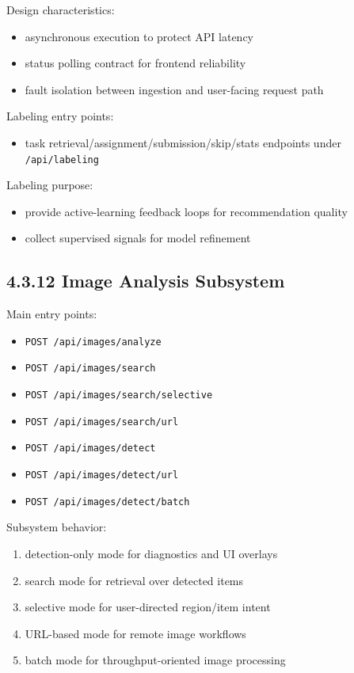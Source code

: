 \documentclass[12pt,a4paper]{report}
\begin{document}
Design characteristics:

\begin{itemize}
\item asynchronous execution to protect API latency
\item status polling contract for frontend reliability
\item fault isolation between ingestion and user-facing request path
\end{itemize}

Labeling entry points:

\begin{itemize}
\item task retrieval/assignment/submission/skip/stats endpoints under \texttt{/api/labeling}
\end{itemize}

Labeling purpose:

\begin{itemize}
\item provide active-learning feedback loops for recommendation quality
\item collect supervised signals for model refinement
\end{itemize}

\subsection{4.3.12 Image Analysis Subsystem}
Main entry points:

\begin{itemize}
\item \texttt{POST /api/images/analyze}
\item \texttt{POST /api/images/search}
\item \texttt{POST /api/images/search/selective}
\item \texttt{POST /api/images/search/url}
\item \texttt{POST /api/images/detect}
\item \texttt{POST /api/images/detect/url}
\item \texttt{POST /api/images/detect/batch}
\end{itemize}

Subsystem behavior:

\begin{enumerate}
\item detection-only mode for diagnostics and UI overlays
\item search mode for retrieval over detected items
\item selective mode for user-directed region/item intent
\item URL-based mode for remote image workflows
\item batch mode for throughput-oriented image processing
\end{enumerate}
\end{document}
